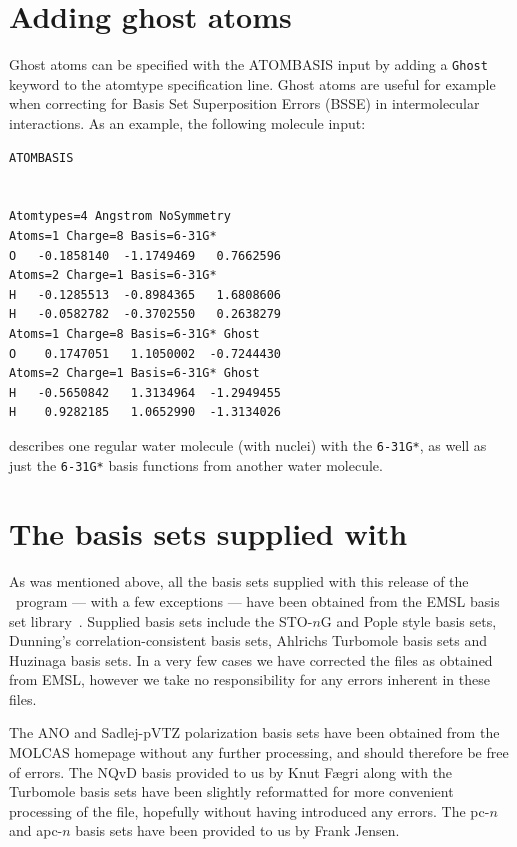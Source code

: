 \section{Adding ghost atoms}
Ghost atoms can be specified with the ATOMBASIS input by adding 
a \verb|Ghost| keyword to the atomtype specification line.
Ghost atoms are useful for example when correcting for 
Basis Set Superposition Errors (BSSE) in intermolecular interactions.
As an example, the following molecule input:
\begin{verbatim}
ATOMBASIS


Atomtypes=4 Angstrom NoSymmetry
Atoms=1 Charge=8 Basis=6-31G*
O   -0.1858140  -1.1749469   0.7662596
Atoms=2 Charge=1 Basis=6-31G*
H   -0.1285513  -0.8984365   1.6808606
H   -0.0582782  -0.3702550   0.2638279
Atoms=1 Charge=8 Basis=6-31G* Ghost
O    0.1747051   1.1050002  -0.7244430
Atoms=2 Charge=1 Basis=6-31G* Ghost
H   -0.5650842   1.3134964  -1.2949455
H    0.9282185   1.0652990  -1.3134026
\end{verbatim}
describes one regular water molecule (with nuclei) with the \verb|6-31G*|,
as well as just the \verb|6-31G*| basis functions from another water molecule.


\section{The basis sets supplied with \dalton }
\label{sec:basislist}

As was mentioned above, all the basis sets supplied with this release
of the \dalton\ program --- with a few exceptions --- have been obtained 
from the EMSL basis set library~\cite{emslref}. 
Supplied basis sets include the STO-$n$G and Pople style basis sets,
Dunning's correlation-consistent basis 
sets, 
Ahlrichs Turbomole basis sets and Huzinaga basis sets. 
In a very few cases we have corrected the
files as obtained from EMSL, however we take no responsibility
for any errors inherent in these files.

The ANO and Sadlej-pVTZ polarization basis sets have been obtained from the
MOLCAS homepage without any further processing, and should therefore
be free of errors. The NQvD basis provided to us by Knut F\ae gri 
along with the Turbomole basis sets have been slightly reformatted for more 
convenient processing of the file, hopefully without having introduced any errors. 
The pc-$n$ and apc-$n$ basis sets have been provided to us by Frank Jensen.

